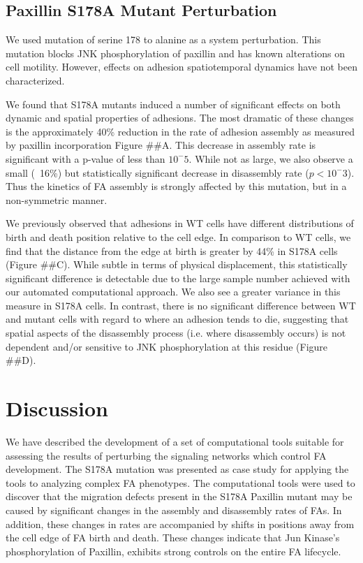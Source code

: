 \documentclass[10pt]{article}
\begin{document}
\subsection*{Paxillin S178A Mutant Perturbation}

We used mutation of serine 178 to alanine as a system perturbation. This
mutation blocks JNK phosphorylation of paxillin and has known alterations on
cell motility. However, effects on adhesion spatiotemporal dynamics have not
been characterized.

We found that S178A mutants induced a number of significant effects on both
dynamic and spatial properties of adhesions. The most dramatic of these changes
is the approximately 40\% reduction in the rate of adhesion assembly as measured
by paxillin incorporation Figure \#\#A. This decrease in assembly rate is
significant with a p-value of less than $10^-5$. While not as large, we also
observe a small (~16\%) but statistically significant decrease in disassembly
rate ($p <10^-3$). Thus the kinetics of FA assembly is strongly affected by this
mutation, but in a non-symmetric manner.

We previously observed that adhesions in  WT cells have different distributions
of birth and death position relative to the cell edge. In comparison to WT
cells, we find that the distance from the edge at birth is greater by 44\% in
S178A cells (Figure \#\#C). While subtle in terms of physical displacement, this
statistically significant difference is detectable due to the large sample
number achieved with our automated computational approach. We also see a greater
variance in this measure in S178A cells. In contrast, there is no significant
difference between WT and mutant cells with regard to where an adhesion tends to
die, suggesting that spatial aspects of the disassembly process (i.e. where
disassembly occurs) is not dependent and/or sensitive to JNK phosphorylation at
this residue (Figure \#\#D).



\section*{Discussion}

We have described the development of a set of computational tools suitable for
assessing the results of perturbing the signaling networks which control FA
development. The S178A mutation was presented as case study for applying the
tools to analyzing complex FA phenotypes. The computational tools were used to
discover that the migration defects present in the S178A Paxillin mutant may be
caused by significant changes in the assembly and disassembly rates of FAs. In
addition, these changes in rates are accompanied by shifts in positions away
from the cell edge of FA birth and death. These changes indicate that Jun
Kinase's phosphorylation of Paxillin, exhibits strong controls on the entire FA
lifecycle.
\end{document}
